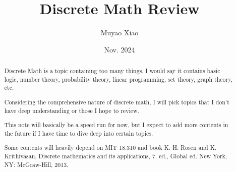 \documentclass[a4paper]{report}
\title{Discrete Math Review}
\author{Muyao Xiao}
\date{Nov. 2024}
\begin{document}
\maketitle

\begin{abstract}
    Discrete Math is a topic containing too many things, I would say it contains basic logic, number theory, probability theory, linear programming, set theory, graph theory, etc.

    Considering the comprehensive nature of discrete math, I will pick topics that I don't have deep understanding or those I hope to review. 

    This note will basically be a speed run for now, but I expect to add more contents in the future if I have time to dive deep into certain topics.

    Some contents will heavily depend on MIT 18.310 and book K. H. Rosen and K. Krithivasan, Discrete mathematics and its applications, 7. ed., Global ed. New York, NY: McGraw-Hill, 2013.
\end{abstract}

\tableofcontents


\pagestyle{plain}
\printbibliography{}
\end{document}

